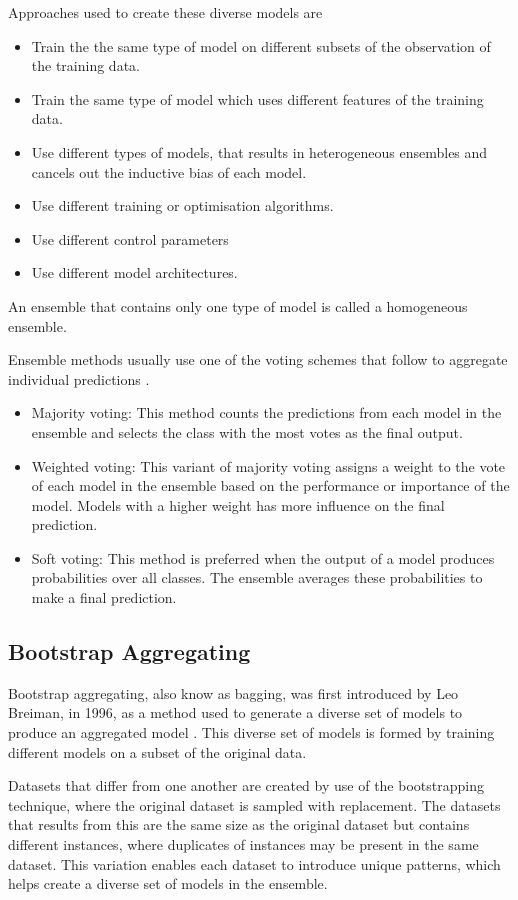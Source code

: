 \documentclass[10pt, conference]{IEEEtran}
\begin{document}
Approaches used to create these diverse models are
\begin{itemize}
    \item Train the the same type of model on different subsets of the observation of the training data.
    \item Train the same type of model which uses different features of the training data.
    \item Use different types of models, that results in heterogeneous ensembles and cancels out the inductive bias of each model.
    \item Use different training or optimisation algorithms.
    \item Use different control parameters
    \item Use different model architectures.
\end{itemize}
An ensemble that contains only one type of model is called a homogeneous ensemble.

Ensemble methods usually use one of the voting schemes that follow to aggregate individual
predictions \cite{Voting_ref}.
\begin{itemize}
    \item Majority voting: This method counts the predictions from each model in the ensemble and selects the class with the most votes as the final output.
    \item Weighted voting: This variant of majority voting assigns a weight to the vote of each model in the ensemble based on the performance or importance of the model.
            Models with a higher weight has more influence on the final prediction.
    \item Soft voting: This method is preferred when the output of a model produces probabilities over all classes. The ensemble averages these probabilities to make a final prediction. 
\end{itemize}

\subsection{Bootstrap Aggregating}

Bootstrap aggregating, also know as bagging, was first introduced by Leo Breiman, in 1996, as a method
used to generate a diverse set of models to produce an aggregated model \cite{Bagging_ref}. This diverse
set of models is formed by training different models on a subset of the original data.

Datasets that differ from one another are created by use of the bootstrapping technique, where
the original dataset is sampled with replacement. The datasets that results from this are the same
size as the original dataset but contains different instances, where duplicates of instances
may be present in the same dataset. This variation enables each dataset to introduce unique
patterns, which helps create a diverse set of models in the ensemble.
\end{document}
